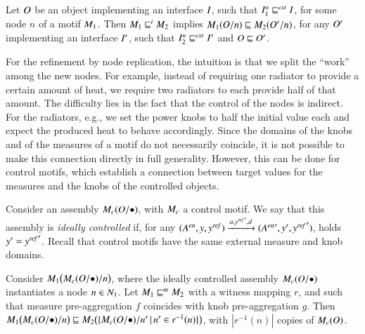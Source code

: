 \documentclass[runningheads]{llncs}
\makeatletter
\newcommand{\eg}[1][\@ ]{e.g.{#1}}
\newcommand{\setdef}[2]{\{#1\,|\,#2\}}
\newcommand{\goesto}[2][]{\xrightarrow[#1]{#2}}
\newcommand{\abstracts}[1][]{\sqsubseteq\ifx#1\relax\else^{#1}\fi}
\newcommand{\isrefinedby}{\abstracts}
\newcommand{\issimulatedby}{\abstracts}
\newcommand{\motif}[1][]{M\ifx#1\relax\else^{#1}\fi}
\newcommand{\interface}[1][]{I\ifx#1\relax\else^{#1}\fi}
\newcommand{\nodes}[1][]{N\ifx#1\relax\else^{#1}\fi}
\newcommand{\action}[1][]{a\ifx#1\relax\else^{#1}\fi}
\newcommand{\actions}[1][]{A\ifx\relax#1\relax\else^{#1}\fi}
\newcommand{\measure}[1][]{y\ifx#1\relax\else^{#1}\fi}
\newcommand{\disturbance}[1][]{d\ifx#1\relax\else^{#1}\fi}
\newcommand{\object}[1][]{O\ifx#1\relax\else^{#1}\fi}
\newcommand{\control}[1][]{c\ifx#1\relax\else^{#1}\fi}
\newcommand{\external}[2][]{\ifx\relax#2\relax#1\mathit{ext}\else#2[#1\mathit{ext}]\fi}
\newcommand{\setpoint}[2][]{#2[{%
      \ifthenelse{\equal{#1}{}}{}{#1,}%
      \mathit{ref}%
  }]%
}
\newcommand{\enabled}[2][]{{#2[\mathit{en}]\ifx#1\relax\else_{#1}\fi}}
\newcommand{\singleton}{\bullet}
\makeatother
\begin{document}
\begin{proposition}
  \label{prop:simulation}
  Let $\object$ be an object implementing an interface $\interface$, such that $\interface[n]_1 \external{\isrefinedby} \interface$, for some node $n$ of a motif $\motif_1$.  Then $\motif_1 \isrefinedby[i] \motif_2$ implies $\motif_1(\object/n) \issimulatedby \motif_2(\object'/n)$, for any $\object'$ implementing an interface $\interface'$, such that  $\interface[n]_2 \external{\isrefinedby} \interface'$ and $\object \issimulatedby \object'$.
\end{proposition}

For the refinement by node replication, the intuition is that we split the ``work'' among the new nodes.  For example, instead of requiring one radiator to provide a certain amount of heat, we require two radiators to each provide half of that amount.  The difficulty lies in the fact that the control of the nodes is indirect.  For the radiators, \eg[,] we set the power knobs to half the initial value each and expect the produced heat to behave accordingly.  Since the domains of the knobs and of the measures of a motif do not necessarily coincide, it is not possible to make this connection directly in full generality.  However, this can be done for control motifs, which establish a connection between target values for the measures and the knobs of the controlled objects.

Consider an assembly $\motif_{\control}(\object/\singleton)$, with $\motif_{\control}$ a control motif.  We say that this assembly is \emph{ideally controlled} if, for any
$
(
\enabled{\actions}
, \measure
, \setpoint{\measure}
) 
\goesto{\action, {\setpoint{\measure}}', \disturbance} 
(
\enabled{\actions}'
, \measure'
, {\setpoint{\measure}}'
)
$, holds $y' = {\setpoint{\measure}}'$.
%
Recall that control motifs have the same external measure and knob domains.

\begin{proposition}
  \label{prop:ideal:control}
  Consider $\motif_{1}\bigl(\motif_{\control}(\object/\singleton)/n\bigr)$, where the ideally controlled assembly $\motif_{\control}(\object/\singleton)$ instantiates a node $n \in \nodes_{1}$.  Let $\motif_1 \isrefinedby[m] \motif_2$ with a witness mapping $r$, and such that measure pre-aggregation $f$ coincides with knob pre-aggregation $g$.  Then $\motif_{1}\bigl(\motif_{\control}(\object/\singleton)/n\bigr) \issimulatedby \motif_{2}\bigl(\setdef{\motif_{\control}(\object/\singleton)/n'}{n' \in r^{-1}(n)}\bigr)$, with $|r^{-1}(n)|$ copies of $\motif_{\control}(\object)$.
\end{proposition}
\end{document}
